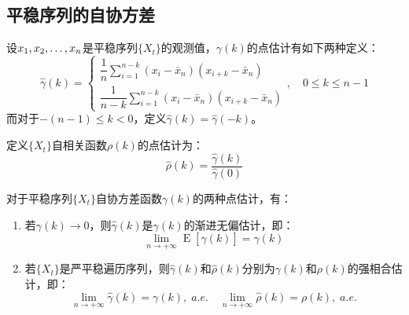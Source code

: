 \subsection{平稳序列的自协方差}
\begin{definition}
	设$x_1, x_2, \dots, x_{n}$是平稳序列$\{X_t\}$的观测值，$\gamma(k)$的点估计有如下两种定义：
	\begin{equation*}
		\hat{\gamma}(k)=
		\begin{cases}
			\dfrac{1}{n}\sum\limits_{i=1}^{n-k}(x_i-\bar{x}_n)(x_{i+k}-\bar{x}_n) \\
			\dfrac{1}{n-k}\sum\limits_{i=1}^{n-k}(x_i-\bar{x}_n)(x_{i+k}-\bar{x}_n)
		\end{cases},\quad 0\leqslant k\leqslant n-1
	\end{equation*}
	而对于$-(n-1)\leqslant k<0$，定义$\hat{\gamma}(k)=\hat{\gamma}(-k)$。\par
	定义$\{X_t\}$自相关函数$\rho(k)$的点估计为：
	\begin{equation*}
		\hat{\rho}(k)=\frac{\hat{\gamma}(k)}{\hat{\gamma}(0)}
	\end{equation*}
\end{definition}
\begin{theorem}
	对于平稳序列$\{X_t\}$自协方差函数$\gamma(k)$的两种点估计，有：
	\begin{enumerate}
		\item 若$\gamma(k)\to0$，则$\hat{\gamma}(k)$是$\gamma(k)$的渐进无偏估计，即：
		\begin{equation*}
			\lim_{n\to+\infty}\operatorname{E}[\hat{\gamma}(k)]=\gamma(k)
		\end{equation*}
		\item 若$\{X_t\}$是严平稳遍历序列，则$\hat{\gamma}(k)$和$\hat{\rho}(k)$分别为$\gamma(k)$和$\rho(k)$的强相合估计，即：
		\begin{equation*}
			\lim_{n\to+\infty}\hat{\gamma}(k)=\gamma(k),\;a.e.\quad
			\lim_{n\to+\infty}\hat{\rho}(k)=\rho(k),\;a.e.
		\end{equation*}
	\end{enumerate}
\end{theorem}
